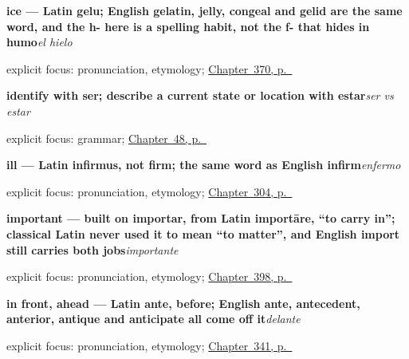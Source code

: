 \noindent\begin{minipage}[t]{\linewidth}
\raggedright
\textbf{ice — Latin gelu; English gelatin, jelly, congeal and gelid are the same word, and the h- here is a spelling habit, not the f- that hides in humo}\enspace\emph{el hielo}\par
\footnotesize explicit focus: pronunciation, etymology; \hyperref[ch:la-tormenta-y-el-trueno]{Chapter~370, p.~\pageref*{ch:la-tormenta-y-el-trueno}}
\end{minipage}\par\smallskip

\noindent\begin{minipage}[t]{\linewidth}
\raggedright
\textbf{identify with ser; describe a current state or location with estar}\enspace\emph{ser vs estar}\par
\footnotesize explicit focus: grammar; \hyperref[ch:ser-y-estar]{Chapter~48, p.~\pageref*{ch:ser-y-estar}}
\end{minipage}\par\smallskip

\noindent\begin{minipage}[t]{\linewidth}
\raggedright
\textbf{ill — Latin infirmus, not firm; the same word as English infirm}\enspace\emph{enfermo}\par
\footnotesize explicit focus: pronunciation, etymology; \hyperref[ch:como-estoy]{Chapter~304, p.~\pageref*{ch:como-estoy}}
\end{minipage}\par\smallskip

\noindent\begin{minipage}[t]{\linewidth}
\raggedright
\textbf{important — built on importar, from Latin importāre, \textquotedblleft{}to carry in\textquotedblright{}; classical Latin never used it to mean \textquotedblleft{}to matter\textquotedblright{}, and English import still carries both jobs}\enspace\emph{importante}\par
\footnotesize explicit focus: pronunciation, etymology; \hyperref[ch:importante-y-facil]{Chapter~398, p.~\pageref*{ch:importante-y-facil}}
\end{minipage}\par\smallskip

\noindent\begin{minipage}[t]{\linewidth}
\raggedright
\textbf{in front, ahead — Latin ante, before; English ante, antecedent, anterior, antique and anticipate all come off it}\enspace\emph{delante}\par
\footnotesize explicit focus: pronunciation, etymology; \hyperref[ch:arriba-y-abajo]{Chapter~341, p.~\pageref*{ch:arriba-y-abajo}}
\end{minipage}\par\smallskip

